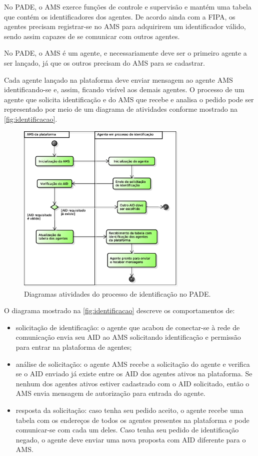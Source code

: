 \documentclass[journal]{IEEEtran}
\begin{document}
No PADE, o AMS exerce funções de controle e supervisão e mantém uma tabela que contém os identificadores dos agentes. De acordo ainda com a FIPA, os agentes precisam registrar-se no AMS para adquirirem um identificador válido, sendo assim capazes de se comunicar com outros agentes.

No PADE, o AMS é um agente, e necessariamente deve ser o primeiro agente a ser lançado, já que os outros precisam do AMS para se cadastrar. 

Cada agente lançado na plataforma deve enviar mensagem ao agente AMS identificando-se e, assim, ficando visível aos demais agentes. O processo de um agente que solicita identificação e do AMS que recebe e analisa o pedido pode ser representado por meio de um diagrama de atividades conforme mostrado na \autoref{fig:identificacao}.

\begin{figure}[!htb]
    \centering
    \includegraphics[width=3.2in]{Figuras/identificacao.eps}
    \caption{\label{fig:identificacao} Diagramas atividades do processo de identificação no PADE.}
\end{figure}

O diagrama mostrado na \autoref{fig:identificacao} descreve os comportamentos de:

\begin{itemize}
  \item solicitação de identificação: o agente que acabou de conectar-se à rede de comunicação envia seu AID ao AMS solicitando identificação e permissão para entrar na plataforma de agentes;
  \item análise de solicitação: o agente AMS recebe a solicitação do agente e verifica se o AID enviado já existe entre os AID dos agentes ativos na plataforma. Se nenhum dos agentes ativos estiver cadastrado com o AID solicitado, então o AMS envia mensagem de autorização para entrada do agente.
  \item resposta da solicitação: caso tenha seu pedido aceito, o agente recebe uma tabela com os endereços de todos os agentes presentes na plataforma e pode comunicar-se com cada um deles. Caso tenha seu pedido de identificação negado, o agente deve enviar uma nova proposta com AID diferente para o AMS.

\end{itemize}
\end{document}
